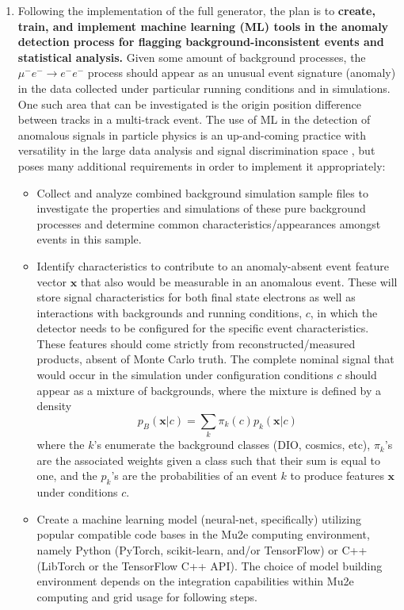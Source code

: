 \documentclass[12pt]{article}
\newcommand{\muEtoEE}{\mu^- e^- \to e^- e^-}
\begin{document}
\begin{enumerate}
 \item \label{goal:MLImplementation}Following the implementation of the full generator, the plan is to \textbf{create, train, and implement machine learning (ML) tools in the anomaly detection process for flagging background-inconsistent events and statistical analysis.} Given some amount of background processes, the $\muEtoEE$ process should appear as an unusual event signature (anomaly) in the data collected under particular running conditions and in simulations. One such area that can be investigated is the origin position difference between tracks in a multi-track event. The use of ML in the detection of anomalous signals in particle physics is an up-and-coming practice with versatility in the large data analysis and signal discrimination space \cite{MLAnomalyDetectionParticlePhysics2023}, but poses many additional requirements in order to implement it appropriately:
 \begin{itemize}
    \item Collect and analyze combined background simulation sample files to investigate the properties and simulations of these pure background processes and determine common characteristics/appearances amongst events in this sample.
     \item Identify characteristics to contribute to an anomaly-absent event feature vector $\mathbf{x}$ that also would be measurable in an anomalous event. These will store signal characteristics for both final state electrons as well as interactions with backgrounds and running conditions, $c$, in which the detector needs to be configured for the specific event characteristics. These features should come strictly from reconstructed/measured products, absent of Monte Carlo truth. The complete nominal signal that would occur in the simulation under configuration conditions $c$ should appear as a mixture of backgrounds, where the mixture is defined by a density
     \begin{equation}\label{DensityFunction}
     p_B(\mathbf{x}|c)=\sum_k \pi_k(c) p_k (\mathbf{x}|c)
     \end{equation} 
     where the $k$'s enumerate the background classes (DIO, cosmics, etc), $\pi_k$'s are the associated weights given a class such that their sum is equal to one, and the $p_k$'s are the probabilities of an event $k$ to produce features $\mathbf{x}$ under conditions $c$. 
     \item Create a machine learning model (neural-net, specifically) utilizing popular compatible code bases in the Mu2e computing environment, namely Python (PyTorch, scikit-learn, and/or TensorFlow) or C++ (LibTorch or the TensorFlow C++ API). The choice of model building environment depends on the integration capabilities within Mu2e computing and grid usage for following steps.

\end{itemize}
\end{enumerate}
\end{document}
